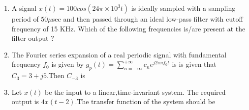 \documentclass[journal,12pt,twocolumn]{IEEEtran}
\begin{document}
\begin{enumerate}
\begin{enumerate}[(A)]
\end{enumerate}

\item A signal $x(t)=100 cos(24 \pi \times 10^{3}t)$ is ideally sampled with a sampling period of 50$\mu$sec and then passed through an ideal low-pass filter with cutoff frequency of 15 KHz. Which of the following frequencies is/are present at the filter output ?

\begin{enumerate}[(A)]
\end{enumerate}

\item The Fourier series expansion of a real periodic signal with fundamental frequency $f_0$ is given by $g_p(t)=\sum\limits_{n=-\infty}^{+\infty} c_n e^{j2\pi n f_0 t}$ is is given that $C_3=3+j5$.Then $C_{-3}$ is
\begin{enumerate}[(A)]
\end{enumerate}

\item Let $x(t)$ be the input to a linear,time-invariant system. The required output is $4x(t-2)$.The transfer function of the system should be
\begin{enumerate}[(A)]
\end{enumerate}




\end{enumerate}
\end{document}

